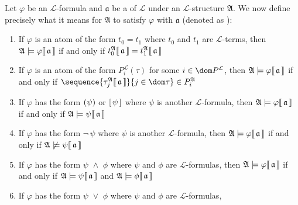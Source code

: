 \begin{dfn}[Satisfaction]
     \label{dfn:first-order-language-satisfaction-of-formulas}
    Let \( \varphi \) be an \( \mathcal{L} \)-formula and \( \mathfrak{a} \) be a 
    of \( \mathcal{L} \) under an \( \mathcal{L} \)-structure \( \mathfrak{A} \).
    We now define precisely what it means for \( \mathfrak{A} \) to satisfy \( \varphi \) with \( \mathfrak{a} \)
    (denoted as ):
    \begin{enumerate}[topsep=2pt,label=\textup{\texttt{(\alph*)}}]
        \item If \( \varphi \) is an atom of the form \( t_{0} = t_{1} \) where \( t_{0} \) and \( t_{1} \) are \( \mathcal{L} \)-terms,
            then \(  \mathfrak{A} \models \varphi\llbracket\, \mathfrak{a} \,\rrbracket \) if and only if
            \( t_{0}^{\mathfrak{A}}\llbracket\, \mathfrak{a} \,\rrbracket = t_{1}^{\mathfrak{A}}\llbracket\, \mathfrak{a} \,\rrbracket \)
        \item If \( \varphi \) is an atom of the form \( P^{\mathcal{L}}_{i}(\tau) \) for some \( i \in \dom P^{\mathcal{L}} \), then
            \(  \mathfrak{A} \models \varphi\llbracket\, \mathfrak{a} \,\rrbracket \) if and only if
            \( \sequence{ \folterminterpretation{\tau_{j}}{\mathfrak{A}}{\mathfrak{a}} }{j \in \dom \tau} \in P^{\mathfrak{A}}_{i} \)
        \item If \( \varphi \) has the form \( \mleft( \psi \mright) \) or \( \mleft[ \,\psi\, \mright] \) where \( \psi \) is another \( \mathcal{L} \)-formula,
            then \(  \mathfrak{A} \models \varphi\llbracket\, \mathfrak{a} \,\rrbracket \) if and only if \(  \mathfrak{A} \models \psi\llbracket\, \mathfrak{a} \,\rrbracket \)
        \item If \( \varphi \) has the form \( \lnot \, \psi \) where \( \psi \) is another \( \mathcal{L} \)-formula, then
            \(  \mathfrak{A} \models \varphi\llbracket\, \mathfrak{a} \,\rrbracket \) if and only if \(  \mathfrak{A} \not\models \psi\llbracket\,\mathfrak{a} \,\rrbracket \)
        \item If \( \varphi \) has the form \( \psi \,\,{\land}\,\, \phi \) where \( \psi \) and \( \phi \) are \( \mathcal{L} \)-formulas,
            then \(  \mathfrak{A} \models \varphi\llbracket\, \mathfrak{a} \,\rrbracket \) if and only if \(  \mathfrak{A} \models \psi\llbracket\, \mathfrak{a} \,\rrbracket \)
            and \(  \mathfrak{A} \models \phi\llbracket\, \mathfrak{a} \,\rrbracket \)
        \item If \( \varphi \) has the form \( \psi \,\,{\lor}\,\, \phi \) where \( \psi \) and \( \phi \) are \( \mathcal{L} \)-formulas,

\end{enumerate}
\end{dfn}
